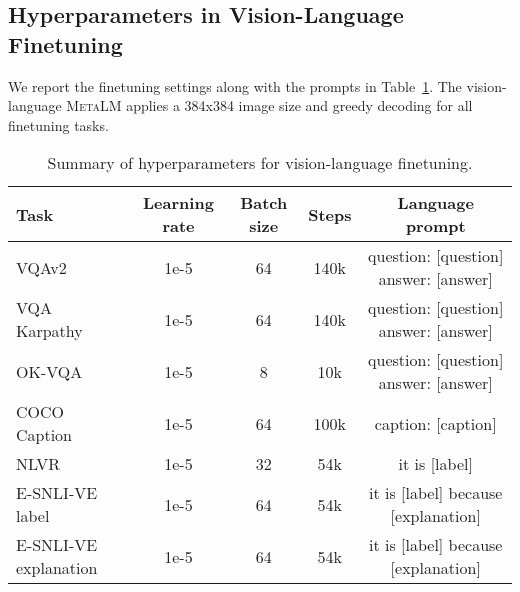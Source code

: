 \documentclass{article}
\theoremstyle{plain}
\theoremstyle{definition}
\theoremstyle{remark}
\newcommand\ours{\textsc{MetaLM}}
\begin{document}
\subsection{Hyperparameters in Vision-Language Finetuning}
\label{app:hyperparam:ft:vl}
We report the finetuning settings along with the prompts in Table~\ref{tab:vl:ft-hparam}. The vision-language \ours{} applies a 384x384 image size and greedy decoding for all finetuning tasks.

\begin{table}[ht]
\centering
\small
\renewcommand\tabcolsep{3.5pt}
\begin{tabular}{lcccc}
\toprule
\textbf{Task} & \textbf{Learning rate} & \textbf{Batch size} & \textbf{Steps} & \textbf{Language prompt} \\ \midrule
VQAv2 & 1e-5 & 64 & 140k & question: [question] answer: [answer] \\
VQA Karpathy & 1e-5 & 64 & 140k & question: [question] answer: [answer] \\
OK-VQA & 1e-5 & 8 & 10k & question: [question] answer: [answer] \\
COCO Caption & 1e-5 & 64 & 100k & caption: [caption] \\
NLVR & 1e-5 & 32 & 54k & it is [label] \\
E-SNLI-VE label & 1e-5 & 64 & 54k & it is [label] because [explanation] \\
E-SNLI-VE explanation & 1e-5 & 64 & 54k & it is [label] because [explanation] \\
\bottomrule
\end{tabular}
\caption{Summary of hyperparameters for vision-language finetuning.}
\label{tab:vl:ft-hparam}
\end{table}
\end{document}
